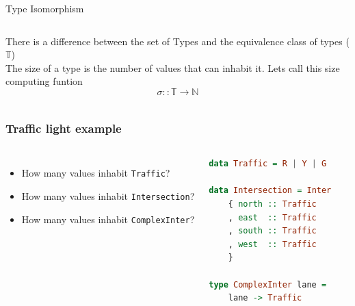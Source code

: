 \documentclass[10pt]{beamer}
\newcommand{\hrsmall}{\noindent\makebox[\linewidth]{\rule{.3\paperwidth}{0.4pt}} \\}
\begin{document}
\begin{frame}[fragile]{Type Isomorphism}
    \begin{columns}
    There is a difference between the set of Types and the equivalence class of types ($\mathbb{T}$)
    \hrsmall
    The size of a type is the number of values that can inhabit it. Lets call this size computing funtion
    $$ \sigma :: \mathbb{T} \rightarrow \mathbb{N} $$


    \end{columns}
\end{frame}


\begin{frame}[fragile]
    \frametitle{Traffic light example}
    \begin{columns} %
    \begin{itemize}
        \item How many values inhabit \texttt{Traffic}?
        \item How many values inhabit \texttt{Intersection}?
        \item How many values inhabit \texttt{ComplexInter}?
    \end{itemize}

    \begin{lstlisting}[language=Haskell]
data Traffic = R | Y | G

data Intersection = Inter
    { north :: Traffic
    , east  :: Traffic
    , south :: Traffic
    , west  :: Traffic
    }
        
type ComplexInter lane =
    lane -> Traffic
    \end{lstlisting}
    \end{columns}
\end{frame}
\end{document}
